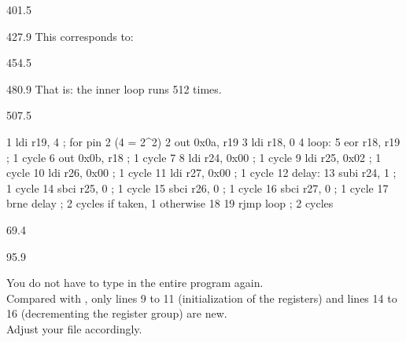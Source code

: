 \documentclass{aslab}
\makeatletter
\newcommand*\aslabarrow{\ding{220}}
\newcommand*\aN[1]{\textcolor{codeorange}{#1}}%
\newcommand*\aI[1]{\textcolor{codegreen}{#1}}%
\newcommand*\aK[1]{\textcolor{codered}{#1}}%
\newcommand*\aR[1]{\textcolor{codecyan}{#1}}%
\newcommand*\aC[1]{\textcolor{codepurple}{#1}}%
\newenvironment{asmlisting}{\par\ttfamily\asm@setup}{\par}
\makeatother
\begin{document}
\begin{region}{401.5}
\end{region}

\begin{region}{427.9}
This corresponds to:
\end{region}

\begin{region}{454.5}
\end{region}

\begin{region}{480.9}
That is: the inner loop runs 512 times.
\end{region}

\begin{region}{507.5}
\begin{asmlisting}
  \aN{1}         \aI{ldi}     \aR{r19},    \aK{4}         \aC{; for pin 2 (4 = 2\textasciicircum2)}
  \aN{2}         \aI{out}     \aK{0x0a},   \aR{r19}
  \aN{3}         \aI{ldi}     \aR{r18},    \aK{0}
  \aN{4 loop}:
  \aN{5}         \aI{eor}     \aR{r18},    \aR{r19}       \aC{; 1 cycle}
  \aN{6}         \aI{out}     \aK{0x0b},   \aR{r18}       \aC{; 1 cycle}
  \aN{7}
  \aN{8}         \aI{ldi}     \aR{r24},    \aK{0x00}      \aC{; 1 cycle}
  \aN{9}         \aI{ldi}     \aR{r25},    \aK{0x02}      \aC{; 1 cycle}
 \aN{10}         \aI{ldi}     \aR{r26},    \aK{0x00}      \aC{; 1 cycle}
 \aN{11}         \aI{ldi}     \aR{r27},    \aK{0x00}      \aC{; 1 cycle}
 \aN{12 delay}:
 \aN{13}         \aI{subi}    \aR{r24},    \aK{1}         \aC{; 1 cycle}
 \aN{14}         \aI{sbci}    \aR{r25},    \aK{0}         \aC{; 1 cycle}
 \aN{15}         \aI{sbci}    \aR{r26},    \aK{0}         \aC{; 1 cycle}
 \aN{16}         \aI{sbci}    \aR{r27},    \aK{0}         \aC{; 1 cycle}
 \aN{17}         \aI{brne}    \aR{delay}             \aC{; 2 cycles if taken, 1 otherwise}
 \aN{18}
 \aN{19}         \aI{rjmp}    \aR{loop}              \aC{; 2 cycles}
\end{asmlisting}
\end{region}

\nextpage
\begin{region}{69.4}
\end{region}

\begin{region}[pitch=13.37]{95.9}
\begin{numlist}
\item You do not have to type in the entire program again.\\
  Compared with , only lines 9 to 11 (initialization
  of the registers) and lines 14 to 16 (decrementing the register group)
  are new.\\
  {\aslabarrow} Adjust your file  accordingly.
\end{numlist}
\end{region}
\end{document}
